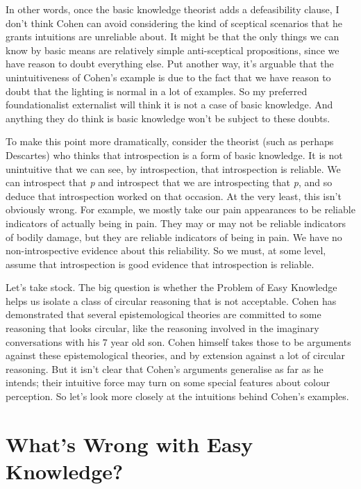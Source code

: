 In other words, once the basic knowledge theorist adds a defeasibility clause, I don't think Cohen can avoid considering the kind of sceptical scenarios that he grants intuitions are unreliable about. It might be that the only things we can know by basic means are relatively simple anti-sceptical propositions, since we have reason to doubt everything else. Put another way, it's arguable that the unintuitiveness of Cohen's example is due to the fact that we have reason to doubt that the lighting is normal in a lot of examples. So my preferred foundationalist externalist will think it is not a case of basic knowledge. And anything they do think is basic knowledge won't be subject to these doubts.

To make this point more dramatically, consider the theorist (such as perhaps Descartes) who thinks that introspection is a form of basic knowledge. It is not unintuitive that we can see, by introspection, that introspection is reliable. We can introspect that \emph{p} and introspect that we are introspecting that \emph{p}, and so deduce that introspection worked on that occasion. At the very least, this isn't obviously wrong. For example, we mostly take our pain appearances to be reliable indicators of actually being in pain. They may or may not be reliable indicators of bodily damage, but they are reliable indicators of being in pain. We have no non-introspective evidence about this reliability. So we must, at some level, assume that introspection is good evidence that introspection is reliable.

Let's take stock. The big question is whether the Problem of Easy Knowledge helps us isolate a class of circular reasoning that is not acceptable. Cohen has demonstrated that several epistemological theories are committed to some reasoning that looks circular, like the reasoning involved in the imaginary conversations with his 7 year old son. Cohen himself takes those to be arguments against these epistemological theories, and by extension against a lot of circular reasoning. But it isn't clear that Cohen's arguments generalise as far as he intends; their intuitive force may turn on some special features about colour perception. So let's look more closely at the intuitions behind Cohen's examples.

\section{What's Wrong with Easy Knowledge?}
\label{whatswrongwitheasyknowledge}

